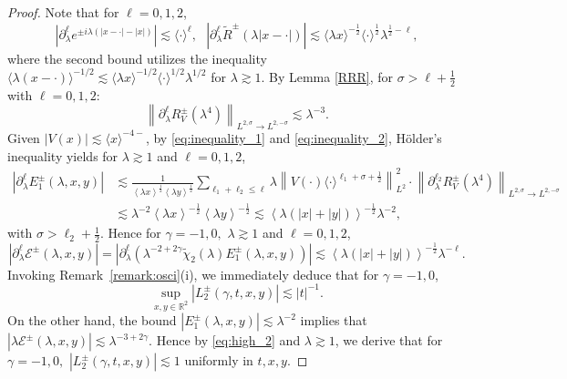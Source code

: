 \documentclass[reqno]{amsart}
\numberwithin{equation}{section}
\begin{document}
\begin{proof}
Note that for $\ell=0,1,2$,
\begin{equation}\label{eq:inequality_1}
 \left|\partial_\lambda^{\ell} e^{\pm i \lambda(|x-\cdot|-|x|)}\right| \lesssim   \langle \cdot \rangle^\ell, \ \ \ 
 \left|\partial_\lambda^{\ell} \widetilde{R}^{\pm}(\lambda |x-\cdot|)\right|
\lesssim \langle \lambda x \rangle^{-\frac{1}{2}} \langle \cdot \rangle^{\frac{1}{2}}\lambda^{\frac{1}{2}-\ell},
\end{equation}
where the second bound utilizes the inequality  $\langle \lambda(x-\cdot) \rangle^{-1/2} \lesssim \langle \lambda x \rangle^{-1/2} \langle  \cdot \rangle^{1/2} \lambda^{1/2}$ for $\lambda \gtrsim 1$.
By Lemma \ref{RRR}, for $\sigma>\ell+\frac{1}{2}$ with $\ell=0,1,2$:
\begin{equation}\label{eq:inequality_2}
\left\|\partial_\lambda^{\ell} R_V^{ \pm}(\lambda^4)\right\|_{L^{2,\sigma} \rightarrow L^{2,-\sigma}} \lesssim \lambda^{-3}.
\end{equation}
Given $|V(x)| \lesssim \langle x \rangle^{-4-}$, by \eqref{eq:inequality_1} and \eqref{eq:inequality_2}, H\"older's inequality yields for $\lambda \gtrsim 1$ and $\ell=0,1,2$,
$$
\begin{aligned}
\left|\partial_\lambda^{\ell} E_{1}^{\pm}(\lambda,x,y)\right|
& \lesssim \frac{1}{\left\langle \lambda x\right\rangle^{\frac{1}{2}}\left\langle \lambda y\right\rangle^{\frac{1}{2}}}\sum_{\ell_1+\ell_2 \le \ell}
\lambda \left\|V(\cdot)\langle\cdot\rangle^{\ell_1+\sigma+\frac{1}{2}}\right\|_{L^2}^2 \cdot\left\|\partial_\lambda^{\ell_2} R_V^{\pm}(\lambda^{4} )\right\|_{L^{2,\sigma} \rightarrow L^{2,-\sigma}}  \\
 & \lesssim \lambda^{-2}  {{\left\langle \lambda x\right\rangle}^{-\frac{1}{2}}{\left\langle \lambda y\right\rangle}^{-\frac{1}{2}}}
 \lesssim \left\langle \lambda (|x|+|y|)\right\rangle^{-\frac{1}{2}}\lambda^{-2},
 \end{aligned}
 $$
with $\sigma > \ell_2 + \frac{1}{2}$.
Hence for $\gamma=-1, 0,$ $\lambda \gtrsim 1$ and $\ell = 0,1,2$,
$$
\left|\partial_\lambda^{\ell} \mathcal{E}^\pm(\lambda,x,y)\right|
=\left|\partial_\lambda^{\ell} \left(\lambda^{-2+2\gamma}\widetilde{\chi}_2(\lambda)E_{1}^{\pm}(\lambda,x,y) \right)\right|
 \lesssim \left\langle \lambda (|x|+|y|)\right\rangle^{-\frac{1}{2}}\lambda^{-\ell}.
$$
Invoking Remark~\ref{remark:osci}(i), we immediately deduce that
 for $\gamma=-1, 0$,
$$\sup_{x,y\in\mathbb{R}^2}|L_2^{\pm}(\gamma,t,x,y)|\lesssim|t|^{-1}.$$
On the other hand, the bound $|E_{1}^{\pm}(\lambda,x,y)| \lesssim \lambda^{-2}$ implies that $|\lambda \mathcal{E}^{\pm}(\lambda,x,y)| \lesssim \lambda^{-3+2\gamma}$. Hence by \eqref{eq:high_2} and $\lambda \gtrsim 1$, we derive that for $\gamma=-1,0,$  $|L_2^\pm(\gamma,t,x,y)|\lesssim 1$  uniformly in $t,x,y.$


\end{proof}
\end{document}
